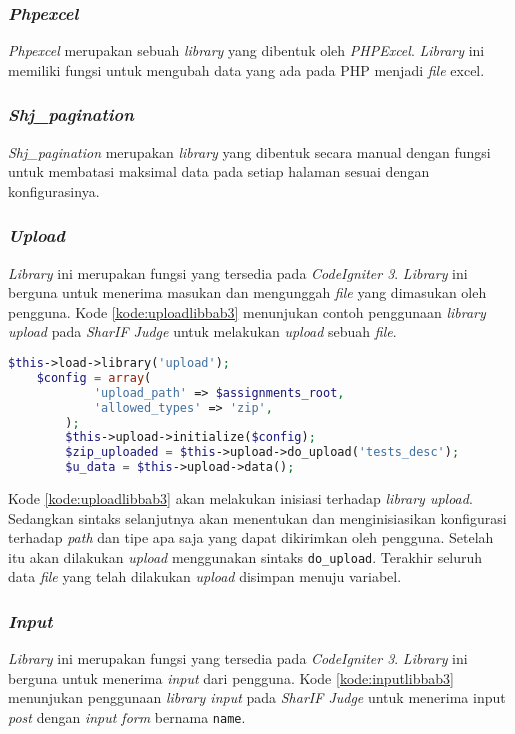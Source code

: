 \subsubsection{\textit{Phpexcel}}
\textit{Phpexcel} merupakan sebuah \textit{library} yang dibentuk oleh \textit{PHPExcel}. \textit{Library} ini memiliki fungsi untuk mengubah data yang ada pada PHP menjadi \textit{file} excel. 

\subsubsection{\textit{Shj\_pagination}}
\textit{Shj\_pagination} merupakan \textit{library} yang dibentuk secara manual dengan fungsi untuk membatasi maksimal data pada setiap halaman sesuai dengan konfigurasinya.

\subsubsection{\textit{Upload}}
\textit{Library} ini merupakan fungsi yang tersedia pada \textit{CodeIgniter 3}. \textit{Library} ini berguna untuk menerima masukan dan mengunggah \textit{file} yang dimasukan oleh pengguna. Kode \ref{kode:uploadlibbab3} menunjukan contoh penggunaan \textit{library upload} pada \textit{SharIF Judge} untuk melakukan \textit{upload} sebuah \textit{file}.

\begin{lstlisting}[language=PHP, caption=Contoh penggunaan \textit{library upload}, label=kode:uploadlibbab3]
	$this->load->library('upload');
	$config = array(
			'upload_path' => $assignments_root,
			'allowed_types' => 'zip',
		);
		$this->upload->initialize($config);
		$zip_uploaded = $this->upload->do_upload('tests_desc');
		$u_data = $this->upload->data();
\end{lstlisting}

Kode \ref{kode:uploadlibbab3} akan melakukan inisiasi terhadap \textit{library upload}. Sedangkan sintaks selanjutnya akan menentukan dan menginisiasikan konfigurasi terhadap \textit{path} dan tipe apa saja yang dapat dikirimkan oleh pengguna. Setelah itu akan dilakukan \textit{upload} menggunakan sintaks \texttt{do\_upload}. Terakhir seluruh data \textit{file} yang telah dilakukan \textit{upload} disimpan menuju variabel.

\subsubsection{\textit{Input}}
\textit{Library} ini merupakan fungsi yang tersedia pada \textit{CodeIgniter 3}. \textit{Library} ini berguna untuk menerima \textit{input} dari pengguna. Kode \ref{kode:inputlibbab3} menunjukan penggunaan \textit{library input} pada \textit{SharIF Judge} untuk menerima input \textit{post} dengan \textit{input form} bernama \texttt{name}.

